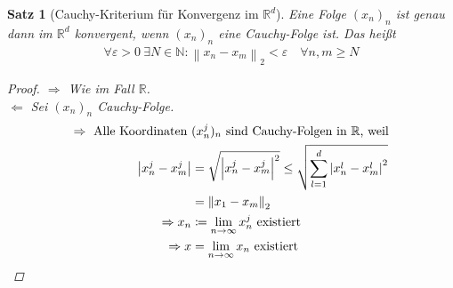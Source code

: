 \documentclass[11pt, twoside, a4paper]{article}
\theoremstyle{plain}
\newtheorem{satz}[blockelement]{Satz}
\newcommand{\abs}[1]{\left\lvert#1\right\rvert}
\newcommand{\norm}[1]{\left\lVert#1\right\rVert}
\newcommand{\impl}[0]{\Rightarrow{}}
\newcommand{\fromto}{\rightarrow{}}
\newcommand{\definedas}[0]{\coloneqq}
\newcommand{\ntoinf}[0]{n\fromto\infty}
\newcommand{\anf}[1]{\glqq{}#1\grqq}
\newcommand{\R}{\mathbb{R}}
\newcommand{\N}{\mathbb{N}}
\begin{document}
    \begin{satz}[Cauchy-Kriterium für Konvergenz im $\R^d$]
        Eine Folge $(x_n)_n$ ist genau dann im $\R^d$ konvergent, wenn $(x_n)_n$ eine Cauchy-Folge ist. Das heißt
        \begin{align*}
            \forall\varepsilon > 0~\exists N\in\N\colon \norm{x_n-x_m}_2 < \varepsilon\quad\forall n,m\geq N
        \end{align*}

        \begin{proof}
            \anf{$\impl$} Wie im Fall $\R$.\\
            \anf{$\Leftarrow$} Sei $(x_n)_n$ Cauchy-Folge.
            \begin{align*}
                \impl\text{ Alle Koordinaten } &(x_n^j)_n\text{ sind Cauchy-Folgen in }\R\text{, weil}\\
                \abs{x_n^j-x_m^j} &= \sqrt {\abs{x_n^j-x_m^j}^2} \leq \sqrt {\sum_{l=1}^{d} \abs{x_n^l - x_m^l}^2}\\
                &= \norm{x_1-x_m}_2\\
                \impl x_n &\definedas \lim_{\ntoinf} x_n^j\text{ existiert}\\
                \impl x &= \lim_{\ntoinf} x_n\text{ existiert}\qedhere
            \end{align*}
        \end{proof}


\end{satz}
\end{document}
